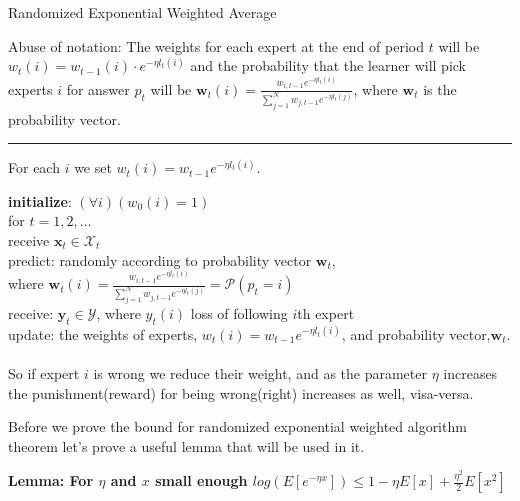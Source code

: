 \documentclass[11pt]{article}
\newcommand\tab[1][1cm]{\hspace*{#1}}
\theoremstyle{quest}
\begin{document}
\begin{tcolorbox}
\begin{center} Randomized Exponential Weighted Average\end{center} 
Abuse of notation: The weights for each expert at the end of period $t$ will be $w_t(i)=w_{t-1}(i)\cdot e^{-\eta l_t(i)}$ and the probability that the learner will pick experts $i$ for answer $p_t$ will be $\mathbf{w}_t(i)=\frac{w_{i,t-1}e^{-\eta l_t(i)}}{\sum_{j=1}^N w_{j,t-1}e^{-\eta l_t(j)}}$, where $\mathbf{w}_t$ is the probability vector.\\
\noindent\rule{\textwidth}{1pt}

For each $i$ we set $w_t(i)=w_{t-1}e^{-\eta l_t(i)}$. 

\textbf{initialize}: $(\forall i)(w_0(i) = 1)$\\
for $t=1,2, \dots $\\
\tab receive $\mathbf{x}_t \in \mathcal{X}_t $ \\
\tab predict: randomly according to probability vector $\mathbf{w}_t$, \\
\tab \tab where $\mathbf{w}_t(i)=\frac{w_{i,t-1}e^{-\eta l_t(i)}}{\sum_{j=1}^N w_{j,t-1}e^{-\eta l_t(j)}}=\mathcal{P}(p_t =i)$\\
\tab receive: $\mathbf{y}_t\in \mathcal{Y}$, where $y_t(i)$ loss of following $i$th expert\\
\tab update: the weights of experts, $w_t(i)=w_{t-1}e^{-\eta l_t(i)}$, and probability vector,$\mathbf{w}_{t}$. \\ \\ 

So if expert $i$ is wrong we reduce their weight, and as the parameter $\eta$ increases the punishment(reward) for being wrong(right) increases as well, visa-versa. 
\end{tcolorbox}
Before we prove the  bound for randomized exponential weighted algorithm theorem let's prove a useful lemma that will be used in it. 
\begin{tcolorbox}
\begin{center}\textbf{Lemma: For $\eta$ and $x$ small enough $log(E[e^{-\eta x}]) \le 1-\eta E[x]+\frac{\eta^2}{2}E[x^2]$}\end{center} \label{e_lemma}
\end{tcolorbox}
\end{document}
